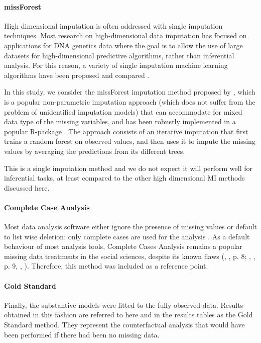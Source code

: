 \paragraph{missForest}
	High dimensional imputation is often addressed with single imputation techniques.
	Most research on high-dimensional data imputation has focused on applications for DNA 
	genetics data where the goal is to allow the use of large datasets for high-dimensional
	predictive algorithms, rather than inferential analysis.
	For this reason, a variety of single imputation machine learning algorithms have been proposed
	and compared \citep{deAndradeSilvaHruschka:2009, stekhovenBuhlmann:2011}.

	In this study, we consider the missForest imputation method proposed by \cite{stekhovenBuhlmann:2011},
	which is a popular non-parametric imputation approach (which does not suffer from the problem of unidentified 
	imputation models) that can accommodate for mixed data type of the missing variables, and has been robustly
	implemented in a popular R-package \citep{missForest}.
	The approach consists of an iterative imputation that first trains a random forest on observed values, and then 
	uses it to impute the missing values by averaging the predictions from its different trees.
	
	This is a single imputation method and we do not expect it will perform well for inferential tasks,
	at least compared to the other high dimensional MI methods discussed here.

\paragraph{Complete Case Analysis}
	Most data analysis software either ignore the presence of missing values or default to list wise deletion: only 
	complete cases are used for the analysis \citep{R:2020, pandas:2020}.
	As a default behaviour of most analysis tools, Complete Cases Analysis remains a popular missing data treatments 
	in the social sciences, despite its known flaws (\citeauthor{rubin:1987}, \citeyear{rubin:1987}, p. 8; 
	\citeauthor{vanBuuren:2012}, \citeyear{vanBuuren:2012}, p. 9, \citeauthor{baraldiEnders:2010}, 
	\citeyear{baraldiEnders:2010}).
	Therefore, this method was included as a reference point.

\paragraph{Gold Standard}
	Finally, the substantive models were fitted to the fully observed data. 
	Results obtained in this fashion are referred to here and in the results tables as the Gold Standard method.
	They represent the counterfactual analysis that would have been performed if there had been no missing data.
